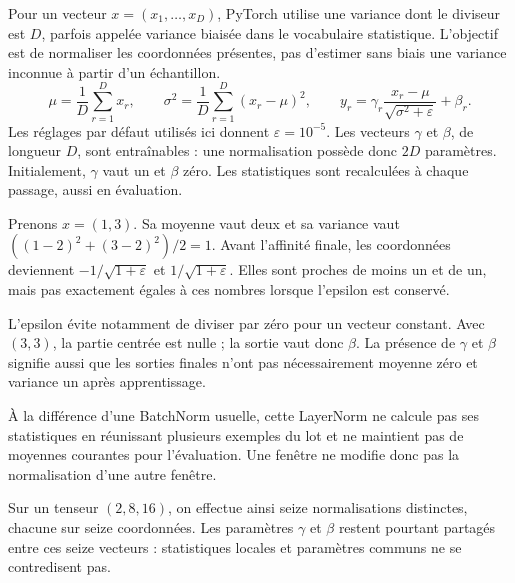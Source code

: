 

Pour un vecteur $x=(x_1,\ldots,x_D)$, PyTorch utilise une variance dont le diviseur est $D$, parfois appelée variance biaisée dans le vocabulaire statistique. L'objectif est de normaliser les coordonnées présentes, pas d'estimer sans biais une variance inconnue à partir d'un échantillon.
\[
 \mu=\frac1D\sum_{r=1}^Dx_r,\qquad
 \sigma^2=\frac1D\sum_{r=1}^D(x_r-\mu)^2,\qquad
 y_r=\gamma_r\frac{x_r-\mu}{\sqrt{\sigma^2+\varepsilon}}+\beta_r.
\]
Les réglages par défaut utilisés ici donnent $\varepsilon=10^{-5}$. Les vecteurs $\gamma$ et $\beta$, de longueur $D$, sont entraînables : une normalisation possède donc $2D$ paramètres. Initialement, $\gamma$ vaut un et $\beta$ zéro. Les statistiques sont recalculées à chaque passage, aussi en évaluation.

Prenons $x=(1,3)$. Sa moyenne vaut deux et sa variance vaut $((1-2)^2+(3-2)^2)/2=1$. Avant l'affinité finale, les coordonnées deviennent $-1/\sqrt{1+\varepsilon}$ et $1/\sqrt{1+\varepsilon}$. Elles sont proches de moins un et de un, mais pas exactement égales à ces nombres lorsque l'epsilon est conservé.

L'epsilon évite notamment de diviser par zéro pour un vecteur constant. Avec $(3,3)$, la partie centrée est nulle ; la sortie vaut donc $\beta$. La présence de $\gamma$ et $\beta$ signifie aussi que les sorties finales n'ont pas nécessairement moyenne zéro et variance un après apprentissage.

À la différence d'une BatchNorm usuelle, cette LayerNorm ne calcule pas ses statistiques en réunissant plusieurs exemples du lot et ne maintient pas de moyennes courantes pour l'évaluation. Une fenêtre ne modifie donc pas la normalisation d'une autre fenêtre.

Sur un tenseur $(2,8,16)$, on effectue ainsi seize normalisations distinctes, chacune sur seize coordonnées. Les paramètres $\gamma$ et $\beta$ restent pourtant partagés entre ces seize vecteurs : statistiques locales et paramètres communs ne se contredisent pas.


